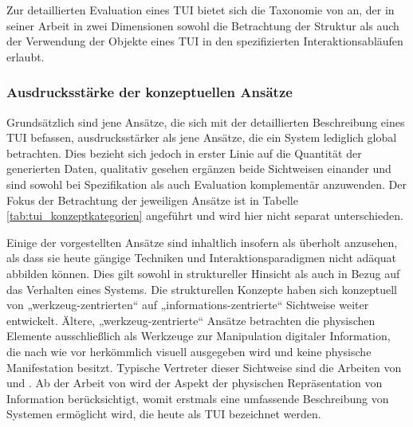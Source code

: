 Zur detaillierten Evaluation eines \gls{TUI} bietet sich die Taxonomie von \citet{Fishkin04} an, der in seiner Arbeit in zwei Dimensionen sowohl die Betrachtung der Struktur als auch der Verwendung der Objekte eines \gls{TUI} in den spezifizierten Interaktionsabläufen erlaubt.

\subsubsection{Ausdrucksstärke der konzeptuellen Ansätze} %
\label{ssub:ausdrucksstärke_der_konzeptuellen_ansätze}

Grundsätzlich sind jene Ansätze, die sich mit der detaillierten Beschreibung eines \gls{TUI} befassen, ausdrucksstärker als jene Ansätze, die ein System lediglich global betrachten. Dies bezieht sich jedoch in erster Linie auf die Quantität der generierten Daten, qualitativ gesehen ergänzen beide Sichtweisen einander und sind sowohl bei Spezifikation als auch Evaluation komplementär anzuwenden. Der Fokus der Betrachtung der jeweiligen Ansätze ist in Tabelle \ref{tab:tui_konzeptkategorien} angeführt und wird hier nicht separat unterschieden.

Einige der vorgestellten Ansätze sind inhaltlich insofern als überholt anzusehen, als dass sie heute gängige Techniken und Interaktionsparadigmen nicht adäquat abbilden können. Dies gilt sowohl in struktureller Hinsicht als auch in Bezug auf das Verhalten eines Systems. Die strukturellen Konzepte haben sich konzeptuell von „werkzeug-zentrierten“ auf „informations-zentrierte“ Sichtweise weiter entwickelt. Ältere, „werkzeug-zentrierte“ Ansätze betrachten die physischen Elemente ausschließlich als Werkzeuge zur Manipulation digitaler Information, die nach wie vor herkömmlich visuell ausgegeben wird und keine physische Manifestation besitzt. Typische Vertreter dieser Sichtweise sind die Arbeiten von \citet{Fitzmaurice95} und \citet{Fitzmaurice96}. Ab der Arbeit von \citet{Ishii97} wird der Aspekt der physischen Repräsentation von Information berücksichtigt, womit erstmals eine umfassende Beschreibung von Systemen ermöglicht wird, die heute als \gls{TUI} bezeichnet werden.

